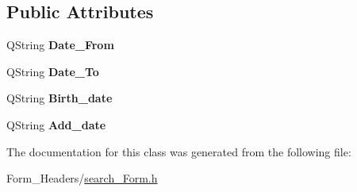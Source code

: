 \subsection*{Public Attributes}
\begin{DoxyCompactItemize}
\item 
\mbox{\label{class_search_a2605cfeadf34c984ba9e2b77a2f51c2f}} 
Q\+String {\bfseries Date\+\_\+\+From}
\item 
\mbox{\label{class_search_a59bbcebb78f6cdb1de7c4d4fa4137e54}} 
Q\+String {\bfseries Date\+\_\+\+To}
\item 
\mbox{\label{class_search_a50fbb9c00b4da42c79a7c8fa79935763}} 
Q\+String {\bfseries Birth\+\_\+date}
\item 
\mbox{\label{class_search_a0ba24b70a5ba63a39d1d45abd89be259}} 
Q\+String {\bfseries Add\+\_\+date}
\end{DoxyCompactItemize}


The documentation for this class was generated from the following file\+:\begin{DoxyCompactItemize}
\item 
Form\+\_\+\+Headers/\mbox{\hyperlink{search___form_8h}{search\+\_\+\+Form.\+h}}\end{DoxyCompactItemize}
